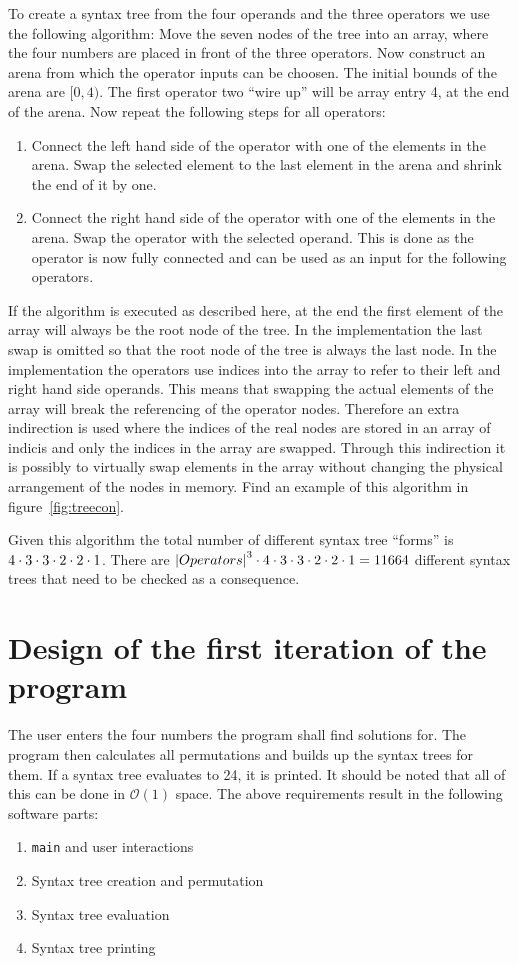 \documentclass[11pt,a4paper]{article}
\begin{document}
To create a syntax tree from the four operands and the three operators
we use the following algorithm:
Move the seven nodes of the tree into an array, where the four
numbers are placed in front of the three operators.
Now construct an arena from which the operator inputs can be
choosen. The initial bounds of the arena are $[0, 4)$.
The first operator two ``wire up'' will be array entry 4, at the end
of the arena.
Now repeat the following steps for all operators:
\begin{enumerate}
  \item Connect the left hand side of the operator with one of the
    elements in the arena. Swap the selected element to the last
    element in the arena and shrink the end of it by one.
  \item Connect the right hand side of the operator with one of the
    elements in the arena. Swap the operator with the selected
    operand. This is done as the operator is now fully connected and
    can be used as an input for the following operators.
\end{enumerate}
If the algorithm is executed as described here, at the end the first
element of the array will always be the root node of the tree. In the
implementation the last swap is omitted so that the root node of the
tree is always the last node.
In the implementation the operators use indices into the array to
refer to their left and right hand side operands. This means that
swapping the actual elements of the array will break the referencing
of the operator nodes.
Therefore an extra indirection is used where the indices of the real
nodes are stored in an array of indicis and only the indices in the
array are swapped.
Through this indirection it is possibly to virtually swap elements in
the array without changing the physical arrangement of the nodes in
memory.
Find an example of this algorithm in figure~\ref{fig:treecon}.

Given this algorithm the total number of different syntax tree
``forms'' is $4 \cdot 3 \cdot 3 \cdot 2 \cdot 2 \cdot 1$.
There are ${\vert Operators \vert}^3 \cdot 4 \cdot 3 \cdot 3 \cdot 2 \cdot 2 \cdot 1 = 11664$ different syntax trees
that need to be checked as a consequence.

\section{Design of the first iteration of the program}

The user enters the four numbers the program shall find solutions
for. The program then calculates all permutations and builds up the
syntax trees for them. If a syntax tree evaluates to 24, it is
printed.
It should be noted that all of this can be done in $\mathcal{O}(1)$
space.
The above requirements result in the following software parts:
\begin{enumerate}
\item {\tt main} and user interactions
\item Syntax tree creation and permutation
\item Syntax tree evaluation
\item Syntax tree printing
\end{enumerate}
\end{document}
